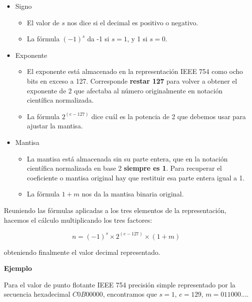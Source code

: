 \documentclass[spanish,A4,]{article}
\begin{document}
\begin{itemize}
\itemsep1pt\parskip0pt
\item
  Signo

  \begin{itemize}
  \itemsep1pt\parskip0pt
  \item
    El valor de $s$ nos dice si el decimal es positivo o negativo.
  \item
    La fórmula $(-1)^s$ da -1 si $s=1$, y 1 si $s=0$.
  \end{itemize}
\item
  Exponente

  \begin{itemize}
  \itemsep1pt\parskip0pt
  \item
    El exponente está almacenado en la representación IEEE 754 como ocho
    bits en exceso a 127. Corresponde \textbf{restar 127} para volver a
    obtener el exponente de 2 que afectaba al número originalmente en
    notación científica normalizada.
  \item
    La fórmula $2^{(e - 127)}$ dice cuál es la potencia de 2 que debemos
    usar para ajustar la mantisa.
  \end{itemize}
\item
  Mantisa

  \begin{itemize}
  \itemsep1pt\parskip0pt
  \item
    La mantisa está almacenada sin su parte entera, que en la notación
    científica normalizada en base 2 \textbf{siempre es 1}. Para
    recuperar el coeficiente o mantisa original hay que restituir esa
    parte entera igual a 1.
  \item
    La fórmula $1 + m$ nos da la mantisa binaria original.
  \end{itemize}
\end{itemize}

Reuniendo las fórmulas aplicadas a los tres elementos de la
representación, hacemos el cálculo multiplicando los tres factores:

\[n = (-1)^s \times 2^{(e-127)}  \times (1+m)\]

obteniendo finalmente el valor decimal representado.

\textbf{Ejemplo}

Para el valor de punto flotante IEEE 754 precisión simple representado
por la secuencia hexadecimal $C0B00000$, encontramos que $s=1$, $e=129$,
$m=011000...$.
\end{document}
